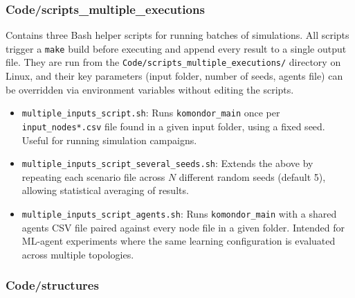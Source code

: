 \documentclass[11pt,a4paper]{article}
\begin{document}
\subsubsection{Code/scripts\_multiple\_executions}

Contains three Bash helper scripts for running batches of simulations. All scripts trigger a \texttt{make} build before executing and append every result to a single output file. They are run from the \texttt{Code/scripts\_multiple\_executions/} directory on Linux, and their key parameters (input folder, number of seeds, agents file) can be overridden via environment variables without editing the scripts.

\begin{itemize}
    \item \texttt{multiple\_inputs\_script.sh}: Runs \texttt{komondor\_main} once per \texttt{input\_nodes*.csv} file found in a given input folder, using a fixed seed. Useful for running simulation campaigns.
    \item \texttt{multiple\_inputs\_script\_several\_seeds.sh}: Extends the above by repeating each scenario file across $N$ different random seeds (default 5), allowing statistical averaging of results.
    \item \texttt{multiple\_inputs\_script\_agents.sh}: Runs \texttt{komondor\_main} with a shared agents CSV file paired against every node file in a given folder. Intended for ML-agent experiments where the same learning configuration is evaluated across multiple topologies.
\end{itemize}

\subsubsection{Code/structures}
\end{document}
